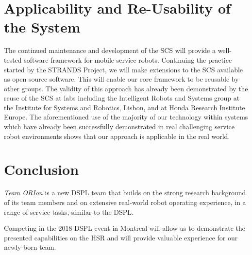 \documentclass[runningheads,a4paper]{llncs}
\newcommand{\teamori}{Team ORIon}
\begin{document}
\section{Applicability and Re-Usability of the System}




The continued maintenance and development of the SCS will provide a well-tested software framework for mobile service robots. Continuing the practice started by the STRANDS Project, we will make extensions to the SCS available as open source software. This will enable our core framework to be reusable by other groups. The validity of this approach has already been demonstrated by the reuse of the SCS at labs including the Intelligent Robots and Systems group at the Institute for Systems and Robotics, Lisbon, and at Honda Research Institute Europe. The aforementioned use of the majority of our technology within systems which have already been successfully demonstrated in real challenging service robot environments shows that our approach is applicable in the real world.

\section{Conclusion}
\textit{\teamori{}} is a new DSPL team that builds on the strong research 
background of its team members and on extensive real-world robot operating
experience, in a range of service tasks, similar to the DSPL. 

Competing in the 2018 DSPL event in Montreal will allow us to demonstrate 
the presented capabilities on the HSR and will provide valuable experience
for our newly-born team.



\end{document}
